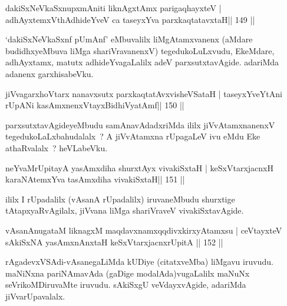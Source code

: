 
\begin{shl}
dakiSxNeV\s kaSxnupxmAniti liknAgxtAmx parigaqhayxteV |
adhAyxtemxV\s thAdhideYveV ca taseyxYva parxkaqtatavxtaH\hfill || 149 ||
\end{shl}

\begin{artha}
`dakiSxNeV\s kaSxnf pUmAnf' eMbuvalilx liMgAtamxvanenx (aMdare   budidhxyeMbuva liMga shariVravanenxV) tegedukoLuLxvudu, EkeMdare,   adhAyxtamx, matutx adhideYvagaLalilx adeV parxsutxtavAgide. adariMda   adanenx garxhisabeVku.
\end{artha}

\begin{shl}
jiVvagarxhoV\s tarx nanavxsutx parxkaqtatAvxvisheVSataH |
taseyxYveYtAni rUpANi kasAmxnenxVtayxBidhiVyatAmf\hfill || 150 ||
\end{shl}

\begin{artha}
parxsutxtavAgideyeMbudu samAnavAdadxriMda ililx jiVvAtamxnanenxV tegedukoLaLxbahudalalx~? A jiVvAtamxna rUpagaLeV ivu eMdu Eke  athaRvalalx~? heVLabeVku.
\end{artha}

\begin{shl}
neYvaMrUpitayA yasAmxdiha shurxtAyx vivakiSxtaH |
keSxVtarxjacnxH karaNAtemxYva tasAmxdiha vivakiSxtaH\hfill || 151 ||
\end{shl}

\begin{artha}
ililx I rUpadalilx (vAsanA rUpadalilx) iruvaneMbudu shurxtige
tAtapxyaRvAgilalx, jiVvana liMga shariVraveV vivakiSxtavAgide.
\end{artha}


\begin{shl}
vAsanAnugataM liknagxM maqdavxnamxqqdivxkirxyAtamxsu |
ceVtayxteV sAkiSxNA yasAmxnAnxtaH keSxVtarxjacnxrUpitA \hfill || 152 ||
\end{shl}

\begin{artha}
rAgadevxVSAdi-vAsanegaLiMda kUDiye (citatxveMba) liMgavu iruvudu. maNiNxna pariNAmavAda (gaDige modalAda)vugaLalilx maNuNx seVrikoMDiruvaMte iruvudu. sAkiSxgU veVdayxvAgide, adariMda jiVvarUpavalalx.
\end{artha}

